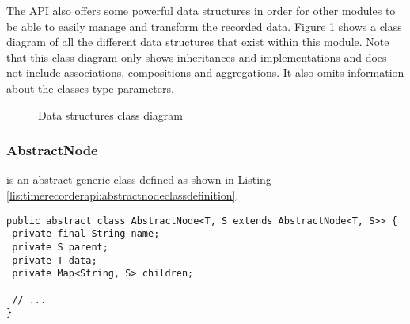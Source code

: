 The API also offers some powerful data structures in order for other modules to be able to easily manage and transform the recorded data. Figure \ref{fig:timerecorerapi:datastructuresclassdiagram} shows a class diagram of all the different data structures that exist within this module. Note that this class diagram only shows inheritances and implementations and does not include associations, compositions and aggregations. It also omits information about the classes type parameters.

\begin{figure}
  \centering
  \caption{Data structures class diagram}
  \label{fig:timerecorerapi:datastructuresclassdiagram}
\end{figure}

\subsubsection{AbstractNode}
 is an abstract generic class defined as shown in Listing \ref{lis:timerecorderapi:abstractnodeclassdefinition}.

\noindent\begin{minipage}[c]{\linewidth}
\begin{lstlisting}[breaklines,caption={AbstractNode class definition},label=lis:timerecorderapi:abstractnodeclassdefinition]
public abstract class AbstractNode<T, S extends AbstractNode<T, S>> {
 private final String name;
 private S parent;
 private T data;
 private Map<String, S> children;

 // ...
}
\end{lstlisting}
\end{minipage}

